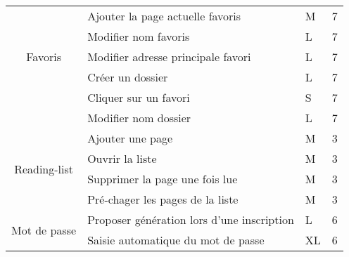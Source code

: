 \documentclass[10pt,a4paper]{article}
\begin{document}
\begin{table}[H]
\begin{tabular}{|c|l|l|l|}
\multirow{5}{*}{Favoris}                & Ajouter la page actuelle favoris             & M                                            & 7                                           \\ \cline{2-4} 
                                        & Modifier nom favoris                         & L                                            & 7                                           \\ \cline{2-4} 
                                        & Modifier adresse principale favori                     & L                                            & 7                                           \\ \cline{2-4} 
                                        & Créer un dossier                             & L                                            & 7                                           \\ \cline{2-4}
                                        & Cliquer sur un favori                             & S                                            & 7                                           \\ \cline{2-4} 
                                        & Modifier nom dossier                         & L                                            & 7                                           \\ \hline
\multirow{4}{*}{Reading-list}           & Ajouter une page                             & M                                            & 3                                           \\ \cline{2-4} 
                                        & Ouvrir la liste                              & M                                            & 3                                           \\ \cline{2-4} 
                                        & Supprimer la page une fois lue               & M                                            & 3                                           \\ \cline{2-4} 
                                        & Pré-chager les pages de la liste             & M                                            & 3                                           \\ \hline
\multirow{4}{*}{Mot de passe}           & Proposer génération lors d'une inscription   & L                                            & 6                                           \\ \cline{2-4} 
                                        & Saisie automatique du mot de passe           & XL                                           & 6                                           \\ \cline{2-4} 

\end{tabular}
\end{table}
\end{document}
